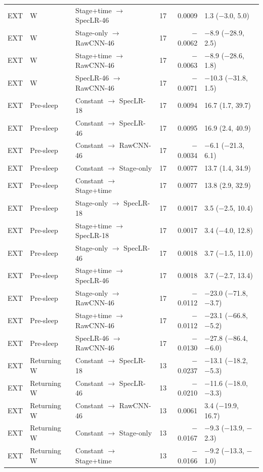 {{\begin{longtable}{@{}lllrrl@{}}
EXT & W & Stage+time $\to$ SpecLR-46 & 17 & 0.0009 & 1.3 ($-$3.0, 5.0) \\
EXT & W & Stage-only $\to$ RawCNN-46 & 17 & $-$0.0062 & $-$8.9 ($-$28.9, 2.5) \\
EXT & W & Stage+time $\to$ RawCNN-46 & 17 & $-$0.0063 & $-$8.9 ($-$28.6, 1.8) \\
EXT & W & SpecLR-46 $\to$ RawCNN-46 & 17 & $-$0.0071 & $-$10.3 ($-$31.8, 1.5) \\
\addlinespace[1pt]
EXT & Pre-sleep & Constant $\to$ SpecLR-18 & 17 & 0.0094 & 16.7 (1.7, 39.7) \\
EXT & Pre-sleep & Constant $\to$ SpecLR-46 & 17 & 0.0095 & 16.9 (2.4, 40.9) \\
EXT & Pre-sleep & Constant $\to$ RawCNN-46 & 17 & $-$0.0034 & $-$6.1 ($-$21.3, 6.1) \\
EXT & Pre-sleep & Constant $\to$ Stage-only & 17 & 0.0077 & 13.7 (1.4, 34.9) \\
EXT & Pre-sleep & Constant $\to$ Stage+time & 17 & 0.0077 & 13.8 (2.9, 32.9) \\
EXT & Pre-sleep & Stage-only $\to$ SpecLR-18 & 17 & 0.0017 & 3.5 ($-$2.5, 10.4) \\
EXT & Pre-sleep & Stage+time $\to$ SpecLR-18 & 17 & 0.0017 & 3.4 ($-$4.0, 12.8) \\
EXT & Pre-sleep & Stage-only $\to$ SpecLR-46 & 17 & 0.0018 & 3.7 ($-$1.5, 11.0) \\
EXT & Pre-sleep & Stage+time $\to$ SpecLR-46 & 17 & 0.0018 & 3.7 ($-$2.7, 13.4) \\
EXT & Pre-sleep & Stage-only $\to$ RawCNN-46 & 17 & $-$0.0112 & $-$23.0 ($-$71.8, $-$3.7) \\
EXT & Pre-sleep & Stage+time $\to$ RawCNN-46 & 17 & $-$0.0112 & $-$23.1 ($-$66.8, $-$5.2) \\
EXT & Pre-sleep & SpecLR-46 $\to$ RawCNN-46 & 17 & $-$0.0130 & $-$27.8 ($-$86.4, $-$6.0) \\
\addlinespace[1pt]
EXT & Returning W & Constant $\to$ SpecLR-18 & 13 & $-$0.0237 & $-$13.1 ($-$18.2, $-$5.3) \\
EXT & Returning W & Constant $\to$ SpecLR-46 & 13 & $-$0.0210 & $-$11.6 ($-$18.0, $-$3.3) \\
EXT & Returning W & Constant $\to$ RawCNN-46 & 13 & 0.0061 & 3.4 ($-$19.9, 16.7) \\
EXT & Returning W & Constant $\to$ Stage-only & 13 & $-$0.0167 & $-$9.3 ($-$13.9, $-$2.3) \\
EXT & Returning W & Constant $\to$ Stage+time & 13 & $-$0.0166 & $-$9.2 ($-$13.3, $-$1.0) \\

\end{longtable}}}

